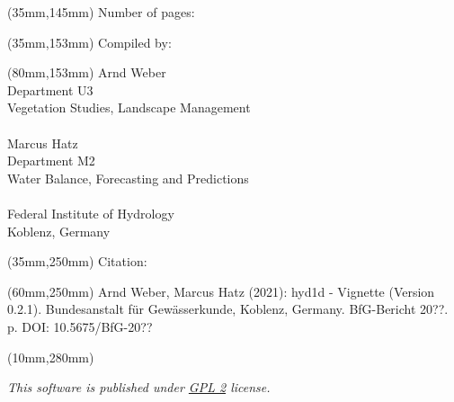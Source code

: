 \begin{titlepage}
    \begin{textblock*}{150mm}(35mm,145mm)
    \fontsize{15}{17}\selectfont\noindent
    Number of pages: \pageref*{LastPage}
    \end{textblock*}

    \begin{textblock*}{150mm}(35mm,153mm)
    \fontsize{15}{17}\selectfont\noindent
    Compiled by:
    \end{textblock*}

    \begin{textblock*}{95mm}(80mm,153mm)
    \fontsize{15}{17}\selectfont\noindent
    Arnd Weber \\
    Department U3 \\
    Vegetation Studies, Landscape Management \\
    \\
    Marcus Hatz \\
    Department M2 \\
    Water Balance, Forecasting and Predictions \\
    \\
    Federal Institute of Hydrology \\
    Koblenz, Germany \\
    \end{textblock*}

    \begin{textblock*}{150mm}(35mm,250mm)
    \fontsize{10}{12}\selectfont\noindent
    Citation:
    \end{textblock*}

    \begin{textblock*}{120mm}(60mm,250mm)
    \fontsize{10}{12}\selectfont\noindent
    Arnd Weber, Marcus Hatz (2021): hyd1d - Vignette (Version 0.2.1). Bundesanstalt für Gewässerkunde, Koblenz, Germany. BfG-Bericht 20??. \pageref*{LastPage} p. DOI: 10.5675/BfG-20??
    \end{textblock*}

    \begin{textblock*}{190mm}(10mm,280mm)
    \fontsize{8}{9}\selectfont\noindent
    \begin{center}
    \textit{This software is published under \href{https://www.gnu.org/licenses/gpl-2.0}{GPL 2} license.}
    \end{center}
    \end{textblock*}
    ~
\end{titlepage}

\newpage

